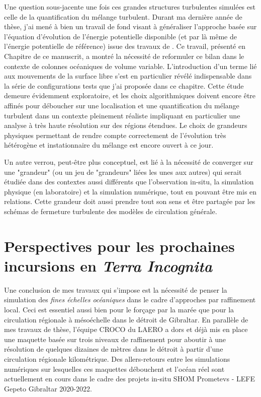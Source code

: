 Une question sous-jacente une fois ces grandes structures turbulentes simulées est celle de la quantification du mélange turbulent. Durant ma dernière année de thèse, j'ai mené à bien un travail de fond visant à généraliser l'approche basée sur l'équation d'évolution de l'énergie potentielle disponible (et par là même de l'énergie potentielle de référence) issue des travaux de \cite{lorenz_available_1955}. Ce travail, présenté en Chapitre  de ce manuscrit, a montré la nécessité de reformuler ce bilan dans le contexte de colonnes océaniques de volume variable. L'introduction d'un terme lié aux mouvements de la surface libre s'est en particulier révélé indispensable dans la série de configurations tests que j'ai proposée dans ce chapitre.
Cette étude demeure évidemment exploratoire, et les choix algorithmiques doivent encore être affinés pour déboucher sur une localisation et une quantification du mélange turbulent dans un contexte pleinement réaliste impliquant en particulier une analyse à très haute résolution sur des régions étendues. Le choix de grandeurs physiques permettant de rendre compte correctement de l'évolution très hétérogène et instationnaire du mélange est encore ouvert à ce jour.

Un autre verrou, peut-être plus conceptuel, est lié à la nécessité de converger sur une "grandeur" (ou un jeu de "grandeurs" liées les unes aux autres) qui serait étudiée dans des contextes aussi différents que l'observation in-situ, la simulation physique (en laboratoire) et la simulation numérique, tout en pouvant être mis en relations. Cette grandeur doit aussi prendre tout son sens et être partagée par les schémas de fermeture turbulente des modèles de circulation générale.

\section{Perspectives pour les prochaines incursions en \textit{Terra Incognita}}

Une conclusion de mes travaux qui s'impose est la nécessité de penser la simulation des \textit{fines échelles océaniques} dans le cadre d'approches par raffinement local. Ceci est essentiel aussi bien pour le forçage par la marée que pour la circulation régionale à mésoéchelle dans le détroit de Gibraltar. En parallèle de mes travaux de thèse, l'équipe CROCO du LAERO a dors et déjà mis en place une maquette basée sur trois niveaux de raffinement pour aboutir à une résolution de quelques dizaines de mètres dans le détroit à partir d'une circulation régionale kilométrique. Des allers-retours entre les simulations numériques sur lesquelles ces maquettes débouchent et l'océan réel sont actuellement en cours dans le cadre des projets in-situ SHOM Prometevs - LEFE Gepeto Gibraltar 2020-2022.

